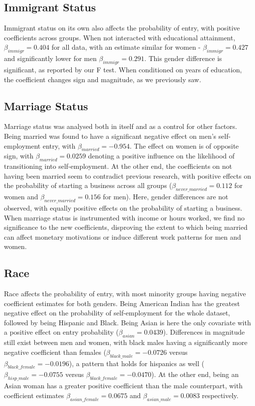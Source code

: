 \subsection{Immigrant Status}

Immigrant status on its own also affects the probability of entry, with positive coefficients across groups. When not interacted with educational attainment, $\beta_{immigr} = 0.404$ for all data, with an estimate similar for women - $\beta_{immigr} = 0.427$ and significantly lower for men $\beta_{immigr} = 0.291$. This gender difference is significant, as reported by our F test. When conditioned on years of education, the coefficient changes sign and magnitude, as we previously saw. 

\subsection{Marriage Status}

Marriage status was analysed both in itself and as a control for other factors. Being married was found to have a significant negative effect on men’s self-employment entry, with $\beta_{married} = -0.954$. The effect on women is of opposite sign, with $\beta_{married} = 0.0259$ denoting a positive influence on the likelihood of transitioning into self-employment. At the other end, the coefficients on not having been married seem to contradict previous research, with positive effects on the probability of starting a business across all groups ($\beta_{never\_married} = 0.112$ for women and $\beta_{never\_married} = 0.156$ for men). Here, gender differences are not observed, with equally positive effects on the probability of starting a business. When marriage status is instrumented with income or  hours worked, we find no significance to the new coefficients, disproving the extent to which being married can affect monetary motivations or induce different work patterns for men and women. 

\subsection{Race}

Race affects the probability of entry, with most minority groups having negative coefficient estimates for both genders. Being American Indian has the greatest negative effect on the probability of self-employment for the whole dataset, followed by being Hispanic and Black. Being Asian is here the only covariate with a positive effect on entry probability ($\beta_{asian} = 0.0439$). Differences in magnitude still exist between men and women, with black males having a significantly more negative coefficient than females ($\beta_{black\_male} = -0.0726$ versus $\beta_{black\_female} = -0.0196$), a pattern that holds for hispanics as well ($\beta_{hisp\_male} = -0.0755$ versus $\beta_{black\_female} = -0.0470$). At the other end, being an Asian woman has a greater positive coefficient than the male counterpart, with coefficient estimates $\beta_{asian\_female} = 0.0675$ and $\beta_{asian\_male} = 0.0083$ respectively. 

